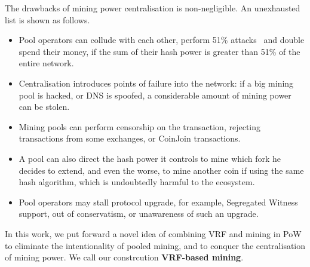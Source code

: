 The drawbacks of mining power centralisation is non-negligible.
An unexhausted list is shown as follows.
\begin{itemize}
    \item Pool operators can collude with each other, perform 51\% attacks~\cite{} and double spend their money, if the sum of their hash power is greater than 51\% of the entire network. 
    \item Centralisation introduces points of failure into the network: if a big mining pool is hacked, or DNS is spoofed, a considerable amount of mining power can be stolen.
    \item Mining pools can perform censorship on the transaction, rejecting transactions from some exchanges, or CoinJoin transactions.
    \item A pool can also direct the hash power it controls to mine which fork he decides to extend, and even the worse, to mine another coin if using the same hash algorithm, which is undoubtedly harmful to the ecosystem.
    \item Pool operators may stall protocol upgrade, for example, Segregated Witness~\cite{segwit} support, out of conservatism, or unawareness of such an upgrade.
\end{itemize}

In this work, we put forward a novel idea of combining VRF and mining in PoW to eliminate the intentionality of pooled mining, and to conquer the centralisation of mining power. We call our constrcution \textbf{VRF-based mining}.
